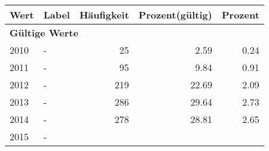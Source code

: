      \begin{longtable}{lXrrr}
     \toprule
     \textbf{Wert} & \textbf{Label} & \textbf{Häufigkeit} & \textbf{Prozent(gültig)} & \textbf{Prozent} \\
     \endhead
     \midrule
     \multicolumn{5}{l}{\textbf{Gültige Werte}}\\

     2010 &
     \multicolumn{1}{X}{ -  } &


       \num{25} &
       \num[round-mode=places,round-precision=2]{2,59} &
         \num[round-mode=places,round-precision=2]{0,24} \\

     2011 &
     \multicolumn{1}{X}{ -  } &


       \num{95} &
       \num[round-mode=places,round-precision=2]{9,84} &
         \num[round-mode=places,round-precision=2]{0,91} \\

     2012 &
     \multicolumn{1}{X}{ -  } &


       \num{219} &
       \num[round-mode=places,round-precision=2]{22,69} &
         \num[round-mode=places,round-precision=2]{2,09} \\

     2013 &
     \multicolumn{1}{X}{ -  } &


       \num{286} &
       \num[round-mode=places,round-precision=2]{29,64} &
         \num[round-mode=places,round-precision=2]{2,73} \\

     2014 &
     \multicolumn{1}{X}{ -  } &


       \num{278} &
       \num[round-mode=places,round-precision=2]{28,81} &
         \num[round-mode=places,round-precision=2]{2,65} \\

     2015 &
     \multicolumn{1}{X}{ -  } &



\end{longtable}
